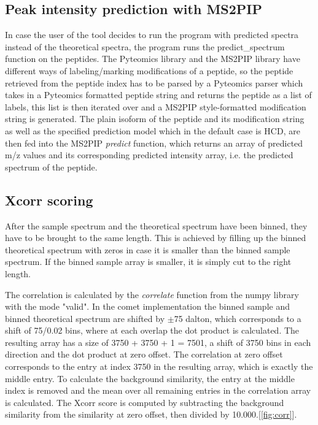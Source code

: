 \documentclass[11pt]{article}
\begin{document}
\subsection{Peak intensity prediction with MS2PIP}
In case the user of the tool decides to run the program with predicted spectra instead of the theoretical spectra, the program runs the predict\_spectrum function on the peptides. The Pyteomics library and the MS2PIP library have different ways of labeling/marking modifications of a peptide, so the peptide retrieved from the peptide index has to be parsed by a Pyteomics parser which takes in a Pyteomics formatted peptide string and returns the peptide as a list of labels, this list is then iterated over and a MS2PIP style-formatted modification string is generated. The plain isoform of the peptide and its modification string as well as the specified prediction model which in the default case is HCD, are then fed into the MS2PIP \textit{predict} function, which returns an array of predicted m/z values and its corresponding predicted intensity array, i.e. the predicted spectrum of the peptide.

\subsection{Xcorr scoring}
After the sample spectrum and the theoretical spectrum have been binned, they have to be brought to the same length. This is achieved by filling up the binned theoretical spectrum with zeros in case it is smaller than the binned sample spectrum. If the binned sample array is smaller, it is simply cut to the right length. 

The correlation is calculated by the \textit{correlate} function from the numpy library with the mode "valid". In the comet implementation the binned sample and binned theoretical spectrum are shifted by $\pm$75 dalton, which corresponds to a shift of 75/0.02 bins, where at each overlap the dot product is calculated. The resulting array has a size of 3750 + 3750 + 1 = 7501, a shift of 3750 bins in each direction and the dot product at zero offset. The correlation at zero offset corresponds to the entry at index 3750 in the resulting array, which is exactly the middle entry. To calculate the background similarity, the entry at the middle index is removed and the mean over all remaining entries in the correlation array is calculated. The Xcorr score is computed by subtracting the background similarity from the similarity at zero offset, then divided by 10.000.[\cref{fig:corr}].
\end{document}
